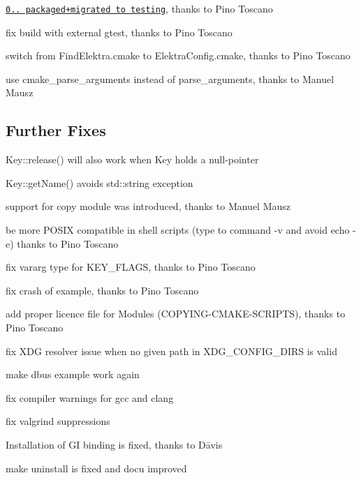 \begin{DoxyItemize}
\item \href{https://packages.qa.debian.org/e/elektra/news/20150726T155000Z.html}{\tt 0.. packaged+migrated to testing}, thanks to Pino Toscano
\item fix build with external gtest, thanks to Pino Toscano
\item switch from Find\+Elektra.\+cmake to Elektra\+Config.\+cmake, thanks to Pino Toscano
\item use {\ttfamily cmake\+\_\+parse\+\_\+arguments} instead of {\ttfamily parse\+\_\+arguments}, thanks to Manuel Mausz
\end{DoxyItemize}

\subsection*{Further Fixes}


\begin{DoxyItemize}
\item Key\+::release() will also work when Key holds a null-\/pointer
\item Key\+::get\+Name() avoids std\+::string exception
\item support for copy module was introduced, thanks to Manuel Mausz
\item be more P\+O\+S\+I\+X compatible in shell scripts ({\ttfamily type} to {\ttfamily command -\/v} and avoid {\ttfamily echo -\/e}) thanks to Pino Toscano
\item fix vararg type for K\+E\+Y\+\_\+\+F\+L\+A\+G\+S, thanks to Pino Toscano
\item fix crash of example, thanks to Pino Toscano
\item add proper licence file for Modules (C\+O\+P\+Y\+I\+N\+G-\/\+C\+M\+A\+K\+E-\/\+S\+C\+R\+I\+P\+T\+S), thanks to Pino Toscano
\item fix X\+D\+G resolver issue when no given path in X\+D\+G\+\_\+\+C\+O\+N\+F\+I\+G\+\_\+\+D\+I\+R\+S is valid
\item make dbus example work again
\item fix compiler warnings for gcc and clang
\item fix valgrind suppressions
\item Installation of G\+I binding is fixed, thanks to Dāvis
\item make uninstall is fixed and docu improved
\end{DoxyItemize}

